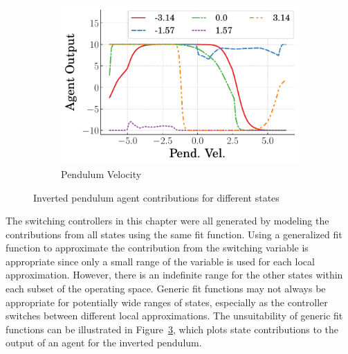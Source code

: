\begin{figure}[tb]
\begin{subfigure}[b]{0.49\textwidth}
        \label{subfig_chap5:agent_contribution_contours_trolley_vel}
    \end{subfigure}
    \hfill
    \begin{subfigure}[b]{0.49\textwidth}
        \centering
        \includegraphics[width=\textwidth]{figures/figures_Interpretability/Invpend_contours/agent_contours_Pend_Vel_trial_0.pdf}
        \caption{Pendulum Velocity}
        \label{subfig_chap5:agent_contribution_contours_pend_vel}
    \end{subfigure}
    \caption{Inverted pendulum agent contributions for different states}
    \label{fig_chap5:agent_contribution_contours}
\end{figure}
%
The switching controllers in this chapter were all generated by modeling the contributions from all states using the same fit function. Using a generalized fit function to approximate the contribution from the switching variable is appropriate since only a small range of the variable is used for each local approximation. However, there is an indefinite range for the other states within each subset of the operating space. Generic fit functions may not always be appropriate for potentially wide ranges of states, especially as the controller switches between different local approximations.
%
The unsuitability of generic fit functions can be illustrated in Figure~\ref{fig_chap5:agent_contribution_contours}, which plots state contributions to the output of an agent for the inverted pendulum.
